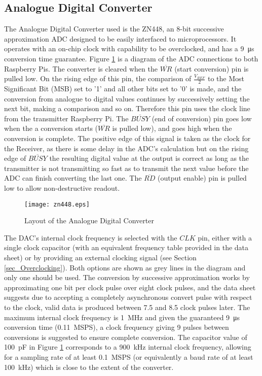 \documentclass[../main.tex]{subfiles}
\begin{document}
\subsection{Analogue Digital Converter}

The Analogue Digital Converter used is the ZN448, an 8-bit successive approximation ADC designed to be easily interfaced to microprocessors.
It operates with an on-chip clock with capability to be overclocked, and has a \SI{9}{\micro\second} conversion time guarantee.
Figure \ref{fig_ADC Layout} is a diagram of the ADC connections to both Raspberry Pis.
The converter is cleared when the $\overline{WR}$ (start conversion) pin is pulled low.
On the rising edge of this pin, the comparison of $\frac{V_{REF}}{2}$ to the Most Significant Bit (MSB) set to '1' and all other bits set to '0' is made, and the conversion from analogue to digital values continues by successively setting the next bit, making a comparison and so on.
Therefore this pin uses the clock line from the transmitter Raspberry Pi.
The $\overline{BUSY}$ (end of conversion) pin goes low when the a conversion starts ($\overline{WR}$ is pulled low), and goes high when the conversion is complete.
The positive edge of this signal is taken as the clock for the Receiver, as there is some delay in the ADC's calculation but on the rising edge of $\overline{BUSY}$ the resulting digital value at the output is correct as long as the transmitter is not transmitting so fast as to transmit the next value before the ADC can finish converting the last one.
The $\overline{RD}$ (output enable) pin is pulled low to allow non-destructive readout.\\

\begin{figure}[ht]
	\centering
	\texttt{[image: zn448.eps]}
	\caption{Layout of the Analogue Digital Converter}
	\label{fig_ADC Layout}
\end{figure}

The DAC's internal clock frequency is selected with the $CLK$ pin, either with a single clock capacitor (with an equivalent frequency table provided in the data sheet) or by providing an external clocking signal (see Section \ref{sec_Overclocking}).
Both options are shown as grey lines in the diagram and only one should be used.
The conversion by successive approximation works by approximating one bit per clock pulse over eight clock pulses, and the data sheet suggests due to accepting a completely asynchronous convert pulse with respect to the clock, valid data is produced between 7.5 and 8.5 clock pulses later.
The maximum internal clock frequency is \SI{1}{\mega\hertz} and given the guaranteed \SI{9}{\micro\second} conversion time (\SI{0.11}{MSPS}), a clock frequency giving 9 pulses between conversions is suggested to ensure complete conversion.
The capacitor value of \SI{100}{\pico\farad} in Figure \ref{fig_ADC Layout} corresponds to a \SI{900}{\kilo\hertz} internal clock frequency, allowing for a sampling rate of at least \SI{0.1}{MSPS} %
(or equivalently a baud rate of at least \SI{100}{\kilo\hertz}) which is close to the extent of the converter.\\
\end{document}
